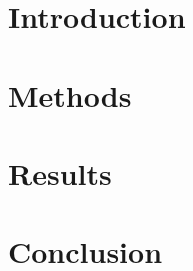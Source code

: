 \documentclass[12pt]{article}
\begin{document}
\maketitle

\begin{abstract}
	
\end{abstract}

\section{Introduction}
\label{sec:introduction}


\section{Methods}
\label{sec:methods}


\section{Results}
\label{sec:results}


\section{Conclusion}
\label{sec:conclusion}





\end{document}
